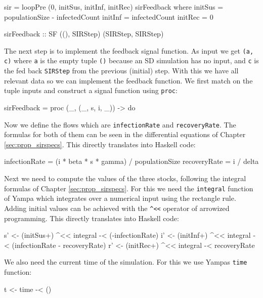 \begin{HaskellCode}
sir = loopPre (0, initSus, initInf, initRec) sirFeedback
  where
    initSus = populationSize - infectedCount
    initInf = infectedCount
    initRec = 0
  
sirFeedback :: SF ((), SIRStep) (SIRStep, SIRStep)
\end{HaskellCode}

The next step is to implement the feedback signal function. As input we get \texttt{(a, c)} where \texttt{a} is the empty tuple \texttt{()} because an SD simulation has no input, and \texttt{c} is the fed back \texttt{SIRStep} from the previous (initial) step. With this we have all relevant data so we can implement the feedback function. We first match on the tuple inputs and construct a signal function using \texttt{proc}:

\begin{HaskellCode}
sirFeedback = proc (_, (_, s, i, _)) -> do
\end{HaskellCode}

Now we define the flows which are \texttt{infectionRate} and \texttt{recoveryRate}. The formulas for both of them can be seen in the differential equations of Chapter \ref{sec:prop_sirspecs}. This directly translates into Haskell code:

\begin{HaskellCode}
infectionRate = (i * beta * s * gamma) / populationSize
recoveryRate  = i / delta
\end{HaskellCode}

Next we need to compute the values of the three stocks, following the integral formulas of Chapter \ref{sec:prop_sirspecs}. For this we need the \texttt{integral} function of Yampa which integrates over a numerical input using the rectangle rule. Adding initial values can be achieved with the \texttt{\string^<<} operator of arrowized programming. This directly translates into Haskell code:

\begin{HaskellCode}
s' <- (initSus+) ^<< integral -< (-infectionRate)
i' <- (initInf+) ^<< integral -< (infectionRate - recoveryRate)
r' <- (initRec+) ^<< integral -< recoveryRate
\end{HaskellCode}

We also need the current time of the simulation. For this we use Yampas \texttt{time} function:

\begin{HaskellCode}
t <- time -< ()
\end{HaskellCode}

